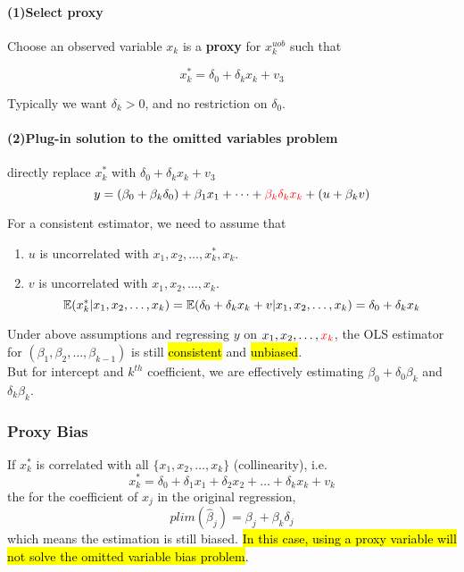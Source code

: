 \documentclass[]{article}
\begin{document}
				\paragraph{(1)Select proxy} Choose an observed variable $x_k$ is a \textbf{proxy} for $x_k^{uob}$ such that
				
				\begin{equation}
					x_k^{*} = \delta_0 + \delta_k x_k + v_3
				\end{equation}
				\begin{assumption}
					Typically we want $\delta_k > 0$, and no restriction on $\delta_0$.
				\end{assumption}
				
				
				\paragraph{(2)Plug-in solution to the omitted variables problem} directly replace $x^*_k$ with $\delta_0 + \delta_k x_k + v_3$
				\begin{equation}
					y = (\beta_0 + \beta_k \delta_0) + \beta_1 x_1 + \dots + \textcolor{red}{\beta_k \delta_k x_k} + (u + \beta_k v)
				\end{equation}
				\begin{assumption}
					For a consistent estimator, we need to assume that
					\begin{enumerate}
						\item $u$ is uncorrelated with $x_1, x_2, \dots, x_k^{*}, x_k$. 
						\item $v$ is uncorrelated with $x_1, x_2, \dots, x_k$.
						\[
							\mathbb{E}({x_k^{*}|x_1,x_2,\dots,x_k}) = \mathbb{E}({\delta_0 + \delta_k x_k + v|x_1,x_2,\dots,x_k}) = \delta_0 + \delta_k x_k
						\]
					\end{enumerate}
				\end{assumption}
				\begin{remark}
					Under above assumptions and regressing $y$ on $x_1, x_2, \dots, \textcolor{red}{x_k}$, the OLS estimator for $(\beta_1, \beta_2, \dots, \beta_{k-1})$ is still \hl{consistent} and \hl{unbiased}.\\
					 But for intercept and $k^{th}$ coefficient, we are effectively estimating $\beta_0 + \delta_0 \beta_k$ and $\delta_k \beta_k$.
				\end{remark}
			\subsubsection{Proxy Bias}
				If $x_k^{*}$ is correlated with all $\{x_1, x_2, \dots, x_k\}$ (collinearity), i.e. 
				\[
					x_k^{*} = \delta_0 + \delta_1 x_1 + \delta_2 x_2 + \dots + \delta_k x_k + v_k
				\]
				the for the coefficient of $x_j$ in the original regression, 
				\[
					plim(\hat{\beta}_j) = \beta_j + \beta_k \delta_j
				\]
				which means the estimation is still biased. \hl{In this case, using a proxy variable will not solve the omitted variable bias problem}.
				
\end{document}
